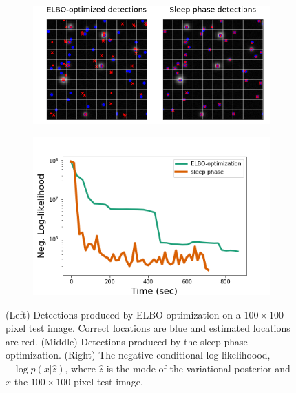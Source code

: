 \begin{figure}[!htb]
    \centering
    \begin{subfigure}[!t]{0.59\textwidth}
    \centering
    \includegraphics[width=\textwidth]{figures/elbo_vs_sleep/optim_path_detect_compare_100x100.png}
    \end{subfigure}
    \begin{subfigure}[!t]{0.4\textwidth}
    \centering
    \includegraphics[width=\textwidth]{figures/elbo_vs_sleep/optim_path_compare_100x100.png}
    \end{subfigure}
    \caption{
    (Left) Detections produced by ELBO optimization on a $100\times 100$ pixel test image. 
    Correct locations are blue and estimated locations are red. 
    (Middle) Detections produced by the sleep phase optimization.  
    (Right) The negative conditional log-likelihoood, $-\log p(x|\hat z)$, where $\hat z$ is the mode of the variational posterior and $x$ the 
    $100\times 100$ pixel test image. }
    \label{fig:sim_data100x100}
\end{figure}
